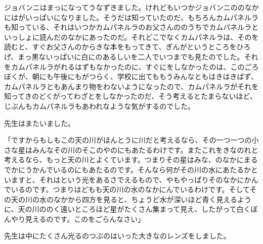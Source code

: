 ジョバンニはまっになってうなずきました。けれどもいつかジョバンニののなかにはがいっぱいになりました。そうだは知っていたのだ、もちろんカムパネルラも知っている、それはいつかカムパネルラのお父さんののうちでカムパネルラといっしょに読んだのなかにあったのだ。それどこでなくカムパネルラは、そのを読むと、すぐお父さんのからきな本をもってきて、ぎんがというところをひろげ、まっ黒ないっぱいに白にのあるしいを二人でいつまでも見たのでした。それをカムパネルラがれるはずもなかったのに、すぐにをしなかったのは、このごろぼくが、朝にも午後にもがつらく、学校に出てももうみんなともはきはきばず、カムパネルラともあんまり物をわないようになったので、カムパネルラがそれを知ってきのどくがってわざとをしなかったのだ、そう考えるとたまらないほど、じぶんもカムパネルラもあわれなような気がするのでした。

先生はまたいました。

「ですからもしもこの天の川がほんとうに川だと考えるなら、その一つ一つの小さな星はみんなその川のそこのやのにもあたるわけです。またこれをきなのれと考えるなら、もっと天の川とよくています。つまりその星はみな、のなかにまるでかにうかんでいるのにもあたるのです。そんなら何がその川の水にあたるかといますと、それはという光をあるさでえるもので、やもやっぱりそのなかにかんでいるのです。つまりはどもも天の川の水のなかにんでいるわけです。そしてその天の川の水のなかから四方を見ると、ちょうど水が深いほど青く見えるように、天の川ののく遠いところほど星がたくさん集まって見え、したがって白くぼんやり見えるのです。このをごらんなさい」

先生は中にたくさん光るのつぶのはいった大きなのレンズをしました。

